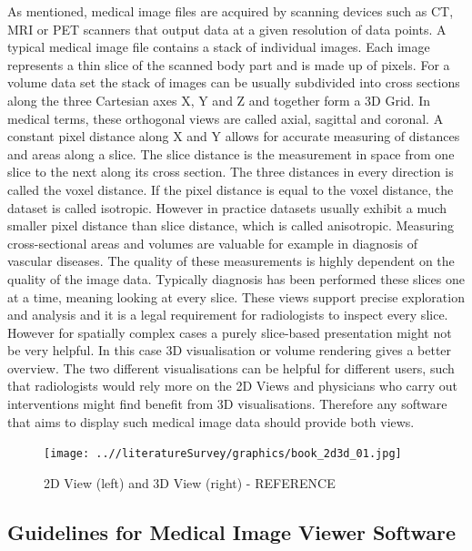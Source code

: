 \documentclass[a4paper,11pt,twoside]{article}
\begin{document}
As mentioned, medical image files are acquired by scanning devices such as CT, MRI or PET scanners that output data at a given resolution of data points. A typical medical image file contains a stack of individual images. Each image represents a thin slice of the scanned body part and is made up of pixels. For a volume data set the stack of images can be usually subdivided into cross sections along the three Cartesian axes X, Y and Z and together form a 3D Grid. In medical terms, these orthogonal views are called axial, sagittal and coronal. A constant pixel distance along X and Y allows for accurate measuring of distances and areas along a slice. The slice distance is the measurement in space from one slice to the next along its cross section. The three distances in every direction is called the voxel distance. If the pixel distance is equal to the voxel distance, the dataset is called isotropic. However in practice datasets usually exhibit a much smaller pixel distance than slice distance, which is called anisotropic.
Measuring cross-sectional areas and volumes are valuable for example in diagnosis of vascular diseases. The quality of these measurements is highly dependent on the quality of the image data. Typically diagnosis has been performed these slices one at a time, meaning looking at every slice. These views support precise exploration and analysis and it is a legal requirement for radiologists to inspect every slice. However for spatially complex cases a purely slice-based presentation might not be very helpful. In this case 3D visualisation or volume rendering gives a better overview. The two different visualisations can be helpful for different users, such that radiologists would rely more on the 2D Views and physicians who carry out interventions might find benefit from 3D visualisations. Therefore any software that aims to display such medical image data should provide both views.


\begin{figure}[ht!]
\centering
\texttt{[image: ..//literatureSurvey/graphics/book\_2d3d\_01.jpg]}
\caption{2D View (left) and 3D View (right) - REFERENCE}
\label{fig:UIdesign1}
\end{figure}



\subsection{Guidelines for Medical Image Viewer Software}
\label{sectionMed}
\end{document}
